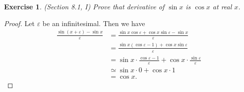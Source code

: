 \documentclass[a4paper, 11pt, openany]{book}
\theoremstyle{plain}
\newtheorem{exercise}{Exercise}[chapter]
\theoremstyle{plain}
\newcommand{\ep}{\varepsilon}
\begin{document}
  \begin{exercise}
    (Section 8.1, I)
    Prove that derivative of $\sin x$ is $\cos x$ at real $x$.
  \end{exercise}
  \begin{proof}
    Let $\ep$ be an infinitesimal. Then we have 
    \begin{align*}
      \frac{\sin(x+\ep)-\sin x}{\ep} &= \frac{\sin x \cos \ep +\cos x \sin \ep - \sin x}{ \ep} \\
      &= \frac{\sin x(\cos \ep -1)+\cos x \sin \ep}{ \ep} \\
      &= \sin x \cdot \frac{\cos \ep -1}{\ep} +  \cos x \cdot \frac{\sin \ep }{ \ep} \\
      &\simeq \sin x \cdot 0 + \cos x \cdot 1 \\
      &=\cos x.
    \end{align*}
  \end{proof}
\end{document}
